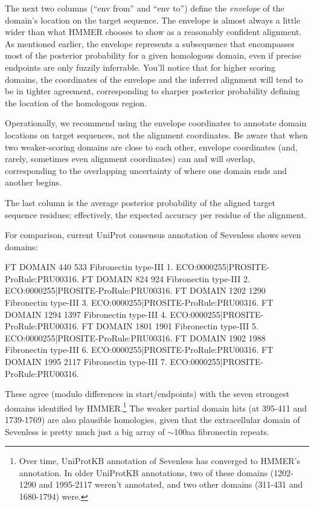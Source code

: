 The next two columns (``env from'' and ``env to'') define the
\emph{envelope} of the domain's location on the target sequence.  The
envelope is almost always a little wider than what HMMER chooses to
show as a reasonably confident alignment. As mentioned earlier, the
envelope represents a subsequence that encompasses most of the
posterior probability for a given homologous domain, even if precise
endpoints are only fuzzily inferrable. You'll notice that for higher
scoring domains, the coordinates of the envelope and the inferred
alignment will tend to be in tighter agreement, corresponding to
sharper posterior probability defining the location of the homologous
region. 

Operationally, we recommend using the envelope coordinates to annotate
domain locations on target sequences, not the alignment
coordinates. Be aware that when two weaker-scoring domains are close
to each other, envelope coordinates (and, rarely, sometimes even
alignment coordinates) can and will overlap, corresponding to the
overlapping uncertainty of where one domain ends and another begins.

The last column is the average posterior probability of the aligned
target sequence residues; effectively, the expected accuracy per
residue of the alignment.

For comparison, current UniProt consensus annotation of Sevenless
shows seven domains:

\begin{samepage}
\begin{sreoutput}
FT   DOMAIN      440    533       Fibronectin type-III 1. {ECO:0000255|PROSITE-ProRule:PRU00316}.
FT   DOMAIN      824    924       Fibronectin type-III 2. {ECO:0000255|PROSITE-ProRule:PRU00316}.
FT   DOMAIN     1202   1290       Fibronectin type-III 3. {ECO:0000255|PROSITE-ProRule:PRU00316}.
FT   DOMAIN     1294   1397       Fibronectin type-III 4. {ECO:0000255|PROSITE-ProRule:PRU00316}.
FT   DOMAIN     1801   1901       Fibronectin type-III 5. {ECO:0000255|PROSITE-ProRule:PRU00316}.
FT   DOMAIN     1902   1988       Fibronectin type-III 6. {ECO:0000255|PROSITE-ProRule:PRU00316}.
FT   DOMAIN     1995   2117       Fibronectin type-III 7. {ECO:0000255|PROSITE-ProRule:PRU00316}.
\end{sreoutput}
\end{samepage}

These agree (modulo differences in start/endpoints) with the seven
strongest domains identified by HMMER.\footnote{Over time, UniProtKB
  annotation of Sevenless has converged to HMMER's annotation. In
  older UniProtKB annotations, two of these domains (1202-1290 and
  1995-2117 weren't annotated, and two other domains (311-431 and
  1680-1794) were.}  The weaker partial domain hits (at 395-411 and
1739-1769) are also plausible homologies, given that the extracellular
domain of Sevenless is pretty much just a big array of $\sim$100aa
fibronectin repeats.


